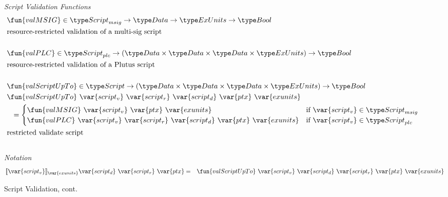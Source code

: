 \begin{figure*}[htb]
  \emph{Script Validation Functions}
  \begin{align*}
    & \fun{valMSIG} \in \ScriptMSig\to \Data \to \ExUnits \to\Bool \\
    & \text{resource-restricted validation of a multi-sig script} \\~\\
    & \fun{valPLC} \in \ScriptPlutus\to (\Data \times \Data \times \Data \times
    \ExUnits) \to \Bool \\
    & \text{resource-restricted validation of a Plutus script} \\~\\
    & \fun{valScriptUpTo} \in \Script\to (\Data \times \Data \times \Data \times \ExUnits)
    \to\Bool \\
    & \fun{valScriptUpTo}~\var{script_v} ~ \var{script_r}~\var{script_d}~\var{ptx}~\var{exunits} \\
    &~~= \begin{cases}
              \fun{valMSIG} ~\var{script_v} ~\var{ptx}~\var{exunits}
               & \text{if}~\var{script_v} \in \ScriptMSig \\
              \fun{valPLC} ~\var{script_v} ~ \var{script_r}~\var{script_d}~\var{ptx}~\var{exunits} & \text{if}~
               \var{script_v} \in \ScriptPlutus
          \end{cases}
    \\ & \text{restricted validate script} \\~\\
  \end{align*}
  \emph{Notation}
  \begin{align*}
    \llbracket \var{script_v} \rrbracket_{\var{exunits}} \var{script_d}~\var{script_r}~\var{ptx}
    &=& \fun{valScriptUpTo} ~\var{script_v} ~ \var{script_d}~\var{script_r}~\var{ptx}~
    \var{exunits}
  \end{align*}
  \caption{Script Validation, cont.}
  \label{fig:defs:functions-valid}
\end{figure*}


\clearpage
